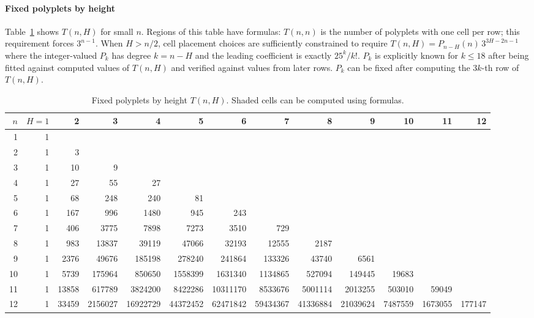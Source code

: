 \documentclass[11pt]{article}
\newcommand{\g}{\cellcolor{gray!15}}
\begin{document}
\paragraph{Fixed polyplets by height} Table~\ref{tab:tnh} shows $T(n,H)$ for small $n$.  Regions of
this table have formulas: $T(n,n)$ is the number of polyplets with one cell per row; this
requirement forces $3^{n-1}$.  When $H>n/2$, cell placement choices are sufficiently constrained to
require $T(n,H) = P_{n-H}(n)\,3^{3H-2n-1}$ where the integer-valued $P_k$ has degree $k=n-H$ and the
leading coefficient is exactly $25^k/k!$.  $P_k$ is explicitly known for $k\le18$ after being fitted
against computed values of $T(n,H)$ and verified against values from later rows.  $P_k$ can be fixed
after computing the $3k$-th row of $T(n,H)$.

\begin{table}
\centering\footnotesize 
\setlength{\tabcolsep}{2.5pt}
\begin{tabular}{r | r r r r r r r r r r r r}
\toprule
$n$ & $H=1$ & 2 & 3 & 4 & 5 & 6 & 7 & 8 & 9 & 10 & 11 & 12\\
\midrule
 1 & \g1\\
 2 & 1 & \g3\\
 3 & 1 & \g10 & \g9\\
 4 & 1 & 27 & \g55 & \g27\\
 5 & 1 & 68 & \g248 & \g240 & \g81\\
 6 & 1 & 167 & 996 & \g1480 & \g945 & \g243\\
 7 & 1 & 406 & 3775 & \g7898 & \g7273 & \g3510 & \g729\\
 8 & 1 & 983 & 13837 & 39119 & \g47066 & \g32193 & \g12555 & \g2187\\
 9 & 1 & 2376 & 49676 & 185198 & \g278240 & \g241864 & \g133326 & \g43740 & \g6561\\
10 & 1 & 5739 & 175964 & 850650 & 1558399 & \g1631340 & \g1134865 & \g527094 & \g149445 & \g19683\\
11 & 1 & 13858 & 617789 & 3824200 & 8422286 & \g10311170 & \g8533676 & \g5001114 & \g2013255 & \g503010 & \g59049\\
12 & 1 & 33459 & 2156027 & 16922729 & 44372452 & 62471842 & \g59434367 & \g41336884 & \g21039624 & \g7487559 & \g1673055 & \g177147\\
\bottomrule
\end{tabular}
\caption{Fixed polyplets by height $T(n, H)$.  Shaded cells can be computed using formulas.}
\label{tab:tnh}
\end{table}
\end{document}
